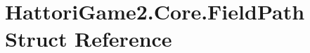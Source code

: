 \hypertarget{struct_hattori_game2_1_1_core_1_1_field_path}{}\section{Hattori\+Game2.\+Core.\+Field\+Path Struct Reference}
\label{struct_hattori_game2_1_1_core_1_1_field_path}
